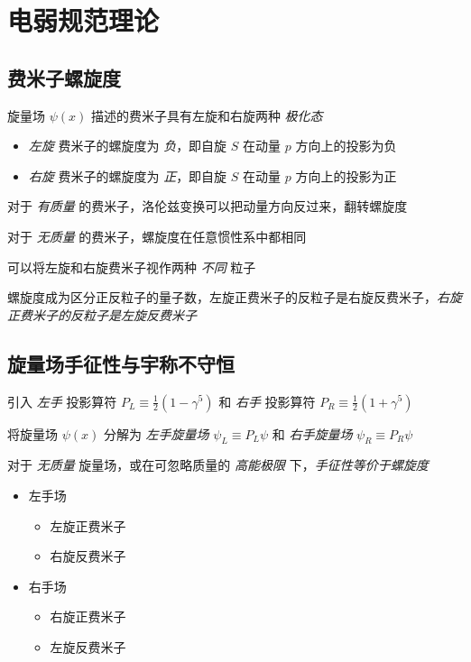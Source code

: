\documentclass[oneside,a4paper,openany,11pt]{ctexbook}
\begin{document}
\section{电弱规范理论}

\subsection{费米子螺旋度}

旋量场 $\psi(x)$ 描述的费米子具有左旋和右旋两种 \emph{极化态}

\begin{itemize}
    \item \emph{左旋} 费米子的螺旋度为 \emph{负}，即自旋 $S$ 在动量 $p$ 方向上的投影为负
    \item \emph{右旋} 费米子的螺旋度为 \emph{正}，即自旋 $S$ 在动量 $p$ 方向上的投影为正
\end{itemize}

对于 \emph{有质量} 的费米子，洛伦兹变换可以把动量方向反过来，翻转螺旋度

对于 \emph{无质量} 的费米子，螺旋度在任意惯性系中都相同

可以将左旋和右旋费米子视作两种 \emph{不同} 粒子

螺旋度成为区分正反粒子的量子数，左旋正费米子的反粒子是右旋反费米子，\emph{右旋正费米子的反粒子是左旋反费米子}

\subsection{旋量场手征性与宇称不守恒}

引入 \emph{左手} 投影算符 $P_L \equiv \frac{1}{2} (1-\gamma^5)$ 和 \emph{右手} 投影算符 $P_R \equiv \frac{1}{2} (1+\gamma^5)$

将旋量场 $\psi(x)$ 分解为 \emph{左手旋量场} $\psi_L \equiv P_L \psi$ 和 \emph{右手旋量场} $\psi_R \equiv P_R \psi$

对于 \emph{无质量} 旋量场，或在可忽略质量的 \emph{高能极限} 下，\emph{手征性等价于螺旋度}

\begin{itemize}
    \item 左手场
        \begin{itemize}
            \item 左旋正费米子
            \item 右旋反费米子
        \end{itemize}
    \item 右手场
        \begin{itemize}
            \item 右旋正费米子
            \item 左旋反费米子
        \end{itemize}
\end{itemize}
\end{document}
